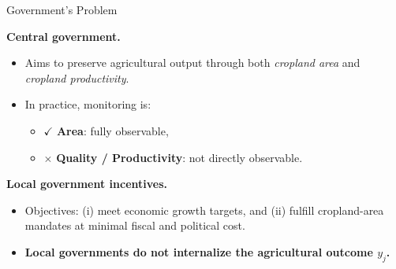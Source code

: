 \documentclass[10pt, xcolor=x11names,compress, aspectratio=169]{beamer}
\begin{document}
\begin{frame}{Government's Problem}

\textbf{Central government.}
\begin{itemize}
  \item Aims to preserve agricultural output through both \emph{cropland area} and \emph{cropland productivity}.
  \item In practice, monitoring is:
  \begin{itemize}
      \item $\checkmark$ \textbf{Area}: fully observable,
      \item $\boldsymbol{\times}$ \textbf{Quality / Productivity}: not directly observable.
  \end{itemize}
\end{itemize}

\medskip

\textbf{Local government incentives.}
\begin{itemize}
  \item Objectives: (i) meet economic growth targets, and  
        (ii) fulfill cropland-area mandates at minimal fiscal and political cost.
  \item \textbf{Local governments do not internalize the agricultural outcome $y_j$.}
\end{itemize}

\end{frame}
\end{document}
